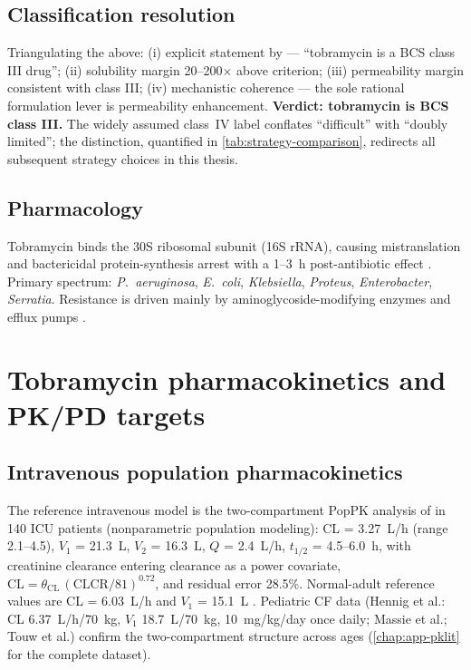 \subsection{Classification resolution}
\label{sec:lit-classification}
Triangulating the above: (i) explicit statement by \citet{Asad2023} --- ``tobramycin is a BCS class III drug''; (ii) solubility margin 20--200$\times$ above criterion; (iii) permeability margin consistent with class III; (iv) mechanistic coherence --- the sole rational formulation lever is permeability enhancement. \textbf{Verdict: tobramycin is BCS class III.} The widely assumed class~IV label conflates ``difficult'' with ``doubly limited''; the distinction, quantified in \cref{tab:strategy-comparison}, redirects all subsequent strategy choices in this thesis.

\subsection{Pharmacology}
Tobramycin binds the 30S ribosomal subunit (16S rRNA), causing mistranslation and bactericidal protein-synthesis arrest with a 1--3~h post-antibiotic effect \citep{Craig1998}. Primary spectrum: \textit{P.~aeruginosa}, \textit{E.~coli}, \textit{Klebsiella}, \textit{Proteus}, \textit{Enterobacter}, \textit{Serratia}. Resistance is driven mainly by aminoglycoside-modifying enzymes and efflux pumps \citep{DrugBank2026}.

\section{Tobramycin pharmacokinetics and PK/PD targets}
\label{sec:lit-pk}

\subsection{Intravenous population pharmacokinetics}
The reference intravenous model is the two-compartment PopPK analysis of \citet{Li2021} in 140 ICU patients (nonparametric population modeling): CL = 3.27~L/h (range 2.1--4.5), $V_1$ = 21.3~L, $V_2$ = 16.3~L, $Q$ = 2.4~L/h, $t_{1/2}$ = 4.5--6.0~h, with creatinine clearance entering clearance as a power covariate, $\mathrm{CL} = \theta_{\mathrm{CL}}\,(\mathrm{CLCR}/81)^{0.72}$, and residual error 28.5\%. Normal-adult reference values are CL = 6.03~L/h and $V_1$ = 15.1~L \citep{Li2021}. Pediatric CF data (Hennig et al.: CL 6.37~L/h/70~kg, $V_1$ 18.7~L/70~kg, 10~mg/kg/day once daily; Massie et al.; Touw et al.) confirm the two-compartment structure across ages (\cref{chap:app-pklit} for the complete dataset).

